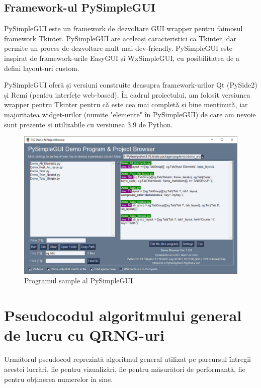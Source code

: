 \subsection{Framework-ul PySimpleGUI}

PySimpleGUI este un framework de dezvoltare GUI wrapper pentru faimosul framework Tkinter. PySimpleGUI are aceleași caracteristici ca Tkinter, dar permite un proces de dezvoltare mult mai dev-friendly. PySimpleGUI este inspirat de framework-urile EasyGUI și WxSimpleGUI, cu posibilitatea de a defini layout-uri custom.

PySimpleGUI oferă și versiuni construite deasupra framework-urilor Qt (PySide2) și Remi (pentru interfețe web-based). În cadrul proiectului, am folosit versiunea wrapper pentru Tkinter pentru că este cea mai completă și bine menținută, iar majoritatea widget-urilor (numite "elemente" în PySimpleGUI) de care am nevoie sunt prezente și utilizabile cu versiunea 3.9 de Python.

\begin{figure}[H]
    \centering
    \includegraphics[width=1\textwidth]{continut/capitol2/figuri/PySimpleGUI.jpg}
    \caption{Programul sample al PySimpleGUI}
    \label{fig:PySimpleGUISample}
\end{figure}

\section{Pseudocodul algoritmului general de lucru cu QRNG-uri}
Următorul pseudocod reprezintă algoritmul general utilizat pe parcursul întregii acestei lucrări, fie pentru vizualizări, fie pentru măsurători de performanță, fie pentru obținerea numerelor în sine. 


